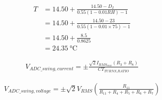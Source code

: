 \documentclass{article}
\begin{document}
\begin{align}
		T &= 14.50 + \frac{14.50 - D_I}{0.55(1 - 0.01RH) - 1} \\
		&= 14.50 + \frac{14.50 - 23}{0.55(1 - 0.01 \times 75) - 1} \\
		&= 14.50 + \frac{8.5}{0.8625} \\
		&= \qty{24.35}{\degreeCelsius}
\end{align}

\begin{align}
	V_{ADC\_swing, current} = \pm \frac{\sqrt{2}I_{RMS_{max}}(R_3 + R_8)}{CT_{TURNS\_RATIO}}
\end{align}

\begin{align}
	V_{ADC\_swing, voltage} = \pm \sqrt{2}V_{RMS} \left( \frac{R_{11}}{R_{11} + R_4+R_5 + R_6 + R_7} \right)
\end{align}
\end{document}
